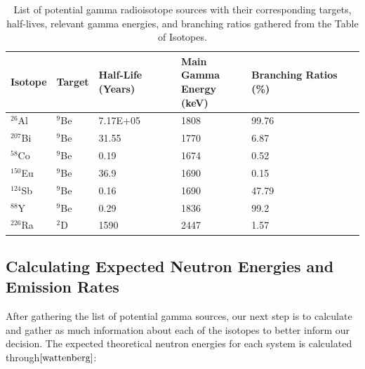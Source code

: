 \documentclass[%
12pt,
twoside,
reprint,
amsmath,amssymb,
aps,
]{article}
\begin{document}
	\begin{table}[t]
		\begin{center}
		\scriptsize
		\begin{tabular}{l l l l l l}
			\hline
			\textbf{Isotope} & \textbf{Target} & \textbf{Half-Life (Years)} & \makecell{\textbf{Main Gamma} \\ \textbf{Energy (keV)}} & \textbf{Branching Ratios (\%)} \\ \hline
			$^{26}$Al            & $^{9}$Be           & 7.17E+05                   & 1808                             & 99.76                          \\ \hline
			$^{207}$Bi           & $^{9}$Be          & 31.55                      & 1770                             & 6.87                           \\ \hline
			$^{58}$Co            & $^{9}$Be            & 0.19                       & 1674                             & 0.52                           \\ \hline
			$^{150}$Eu           & $^{9}$Be           & 36.9                       & 1690                             & 0.15                           \\ \hline
			$^{124}$Sb           & $^{9}$Be           & 0.16                       & 1690                             & 47.79                          \\ \hline
			$^{88}$Y             & $^{9}$Be            & 0.29                       & 1836                             & 99.2                           \\ \hline
			$^{226}$Ra       & $^{2}$D              & 1590                       & 2447                             & 1.57                           \\ \hline
		\end{tabular}
		\caption{\label{tab:table-name} List of potential gamma radioisotope sources with their corresponding targets, half-lives, relevant gamma energies, and branching ratios gathered from the Table of Isotopes.}
	\end{center}
	\end{table}
		
	\subsection{Calculating Expected Neutron Energies and Emission Rates}
	\par After gathering the list of potential gamma sources, our next step is to calculate and gather as much information about each of the isotopes to better inform our decision. The expected theoretical neutron energies for each system is calculated through${\cite{wattenberg}}$:
	
\end{document}

